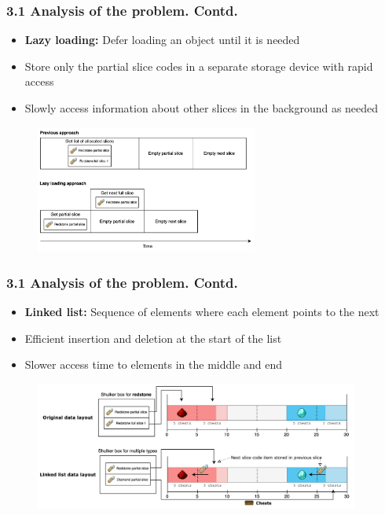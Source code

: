 \documentclass[aspectratio=169]{beamer}
\begin{document}
\begin{frame}
	\frametitle{3.1 Analysis of the problem. Contd.}

    \begin{itemize}
		\item \textbf{Lazy loading:} Defer loading an object until it is needed
        \item Store only the partial slice codes in a separate storage device with rapid access
        \item Slowly access information about other slices in the background as needed
	\end{itemize}
    \begin{figure}
        \includegraphics[width=0.65\textwidth]{lazy.png}
    \end{figure}
\end{frame}

\begin{frame}
	\frametitle{3.1 Analysis of the problem. Contd.}

    \begin{itemize}
		\item \textbf{Linked list:} Sequence of elements where each element points to the next
        \item Efficient insertion and deletion at the start of the list
        \item Slower access time to elements in the middle and end
	\end{itemize}
    \begin{figure}
        \includegraphics[width=0.95\textwidth]{layout2.png}
    \end{figure}
\end{frame}
\end{document}
